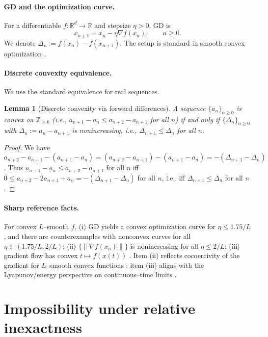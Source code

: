 \documentclass[11pt]{article}
\theoremstyle{plain}
\newtheorem{lemma}[theorem]{Lemma}
\theoremstyle{remark}
\newcommand{\R}{\mathbb{R}}
\begin{document}
\paragraph{GD and the optimization curve.}
For a differentiable $f:\R^d\to\R$ and stepsize $\eta>0$, GD is
\begin{equation}\label{eq:GD}
x_{n+1}=x_n-\eta \nabla f(x_n),\qquad n\ge0.
\end{equation}
We denote $\Delta_n:=f(x_n)-f(x_{n+1})$. The setup is standard in smooth convex optimization \cite{Nesterov2004,Bubeck2015,Nesterov2018}.

\paragraph{Discrete convexity equivalence.}
We use the standard equivalence for real sequences.

\begin{lemma}[Discrete convexity via forward differences]\label{lem:disc}
A sequence $\{a_n\}_{n\ge0}$ is convex on $\mathbb{Z}_{\ge0}$ (i.e., $a_{n+1}-a_n\le a_{n+2}-a_{n+1}$ for all $n$) if and only if $\{\Delta_n\}_{n\ge0}$ with $\Delta_n:=a_n-a_{n+1}$ is nonincreasing, i.e., $\Delta_{n+1}\le \Delta_n$ for all $n$.
\end{lemma}

\begin{proof}
We have $a_{n+2}-a_{n+1}-(a_{n+1}-a_n)=(a_{n+2}-a_{n+1})-(a_{n+1}-a_n)=-(\Delta_{n+1}-\Delta_n)$. Thus $a_{n+1}-a_n\le a_{n+2}-a_{n+1}$ for all $n$ iff $0\le a_{n+2}-2a_{n+1}+a_n=-(\Delta_{n+1}-\Delta_n)$ for all $n$, i.e., iff $\Delta_{n+1}\le \Delta_n$ for all $n$.
\end{proof}

\paragraph{Sharp reference facts.}
For convex $L$--smooth $f$, (i) GD yields a convex optimization curve for $\eta\le 1.75/L$, and there are counterexamples with nonconvex curves for all $\eta\in(1.75/L,2/L)$; (ii) $\{\|\nabla f(x_n)\|\}$ is nonincreasing for all $\eta\le 2/L$; (iii) gradient flow has convex $t\mapsto f(x(t))$ \cite{BarzilaiShamirZamani2025}. Item (ii) reflects cocoercivity of the gradient for $L$--smooth convex functions \cite{BaillonHaddad1977}; item (iii) aligns with the Lyapunov/energy perspective on continuous--time limits \cite{SuBoydCandes2016,AttouchPeypouquet2016}.

\section{Impossibility under relative inexactness}
\end{document}
